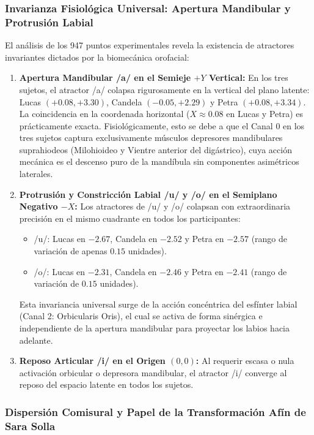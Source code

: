 \documentclass[11pt,a4paper]{article}
\begin{document}
\subsubsection{Invarianza Fisiológica Universal: Apertura Mandibular y Protrusión Labial}
\label{subsubsec:invarianza_fisiologica_universal}

El análisis de los 947 puntos experimentales revela la existencia de atractores invariantes dictados por la biomecánica orofacial:
\begin{enumerate}
    \item \textbf{Apertura Mandibular /a/ en el Semieje $+Y$ Vertical:} En los tres sujetos, el atractor /a/ colapsa rigurosamente en la vertical del plano latente: Lucas $(+0.08, +3.30)$, Candela $(-0.05, +2.29)$ y Petra $(+0.08, +3.34)$. La coincidencia en la coordenada horizontal ($X \approx 0.08$ en Lucas y Petra) es prácticamente exacta. Fisiológicamente, esto se debe a que el Canal 0 en los tres sujetos captura exclusivamente músculos depresores mandibulares suprahiodeos (Milohioideo y Vientre anterior del digástrico), cuya acción mecánica es el descenso puro de la mandíbula sin componentes asimétricos laterales.
    \item \textbf{Protrusión y Constricción Labial /u/ y /o/ en el Semiplano Negativo $-X$:} Los atractores de /u/ y /o/ colapsan con extraordinaria precisión en el mismo cuadrante en todos los participantes:
    \begin{itemize}
        \item /u/: Lucas en $-2.67$, Candela en $-2.52$ y Petra en $-2.57$ (rango de variación de apenas $0.15$ unidades).
        \item /o/: Lucas en $-2.31$, Candela en $-2.46$ y Petra en $-2.41$ (rango de variación de $0.15$ unidades).
    \end{itemize}
    Esta invariancia universal surge de la acción concéntrica del esfínter labial (Canal 2: Orbicularis Oris), el cual se activa de forma sinérgica e independiente de la apertura mandibular para proyectar los labios hacia adelante.
    \item \textbf{Reposo Articular /i/ en el Origen $(0,0)$:} Al requerir escasa o nula activación orbicular o depresora mandibular, el atractor /i/ converge al reposo del espacio latente en todos los sujetos.
\end{enumerate}

\subsubsection{Dispersión Comisural y Papel de la Transformación Afín de Sara Solla}
\label{subsubsec:dispersion_comisural_sara_solla}
\end{document}
